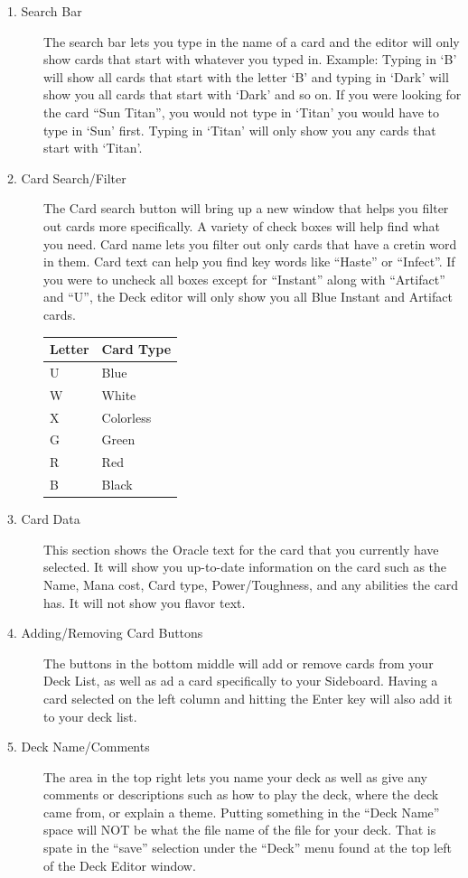 \documentclass[a4paper]{scrbook}
\begin{document}
\begin{description}
 \item[1. Search Bar] The search bar lets you type in the name of a card and the editor will only show cards that start with whatever you typed in. Example: Typing in ‘B’ will show all cards that start with the letter ‘B’ and typing in ‘Dark’ will show you all cards that start with ‘Dark’ and so on. If you were looking for the card “Sun Titan”, you would not type in ‘Titan’ you would have to type in ‘Sun’ first. Typing in ‘Titan’ will only show you any cards that start with ‘Titan’.
 \item[2. Card Search/Filter] The Card search button will bring up a new window that helps you filter out cards more specifically. A variety of check boxes will help find what you need. Card name lets you filter out only cards that have a cretin word in them. Card text can help you find key words like “Haste” or “Infect”. If you were to uncheck all boxes except for “Instant” along with “Artifact” and “U”, the Deck editor will only show you all Blue Instant and Artifact cards.
\begin{center}
\begin{tabular}{ll}
\toprule Letter & Card Type \\ \midrule
U  & Blue \\ 
W  & White \\ 
X  & Colorless \\ 
G  & Green \\ 
R  & Red\\ 
B  & Black \\ \bottomrule
\end{tabular}
\end{center}
 \item[3. Card Data] This section shows the Oracle text for the card that you currently have selected. It will show you up-to-date information on the card such as the Name, Mana cost, Card type, Power/Toughness, and any abilities the card has. It will not show you flavor text.
 \item[4. Adding/Removing Card Buttons]
The buttons in the bottom middle will add or remove cards from your Deck List, as well as ad a card specifically to your Sideboard. Having a card selected on the left column and hitting the Enter key will also add it to your deck list.
 \item[5. Deck Name/Comments]
The area in the top right lets you name your deck as well as give any comments or descriptions such as how to play the deck, where the deck came from, or explain a theme. Putting something in the “Deck Name” space will NOT be what the file name of the file for your deck. That is spate in the “save” selection under the “Deck” menu found at the top left of the Deck Editor window.

\end{description}
\end{document}
